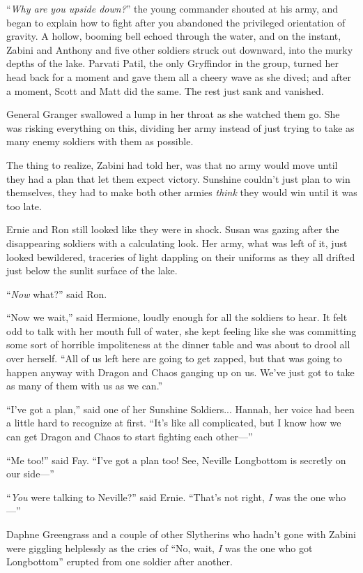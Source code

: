 “\emph{Why are you upside down?}” the young commander shouted at his army, and began to explain how to fight after you abandoned the privileged orientation of gravity.
\sbreak
A hollow, booming bell echoed through the water, and on the instant, Zabini and Anthony and five other soldiers struck out downward, into the murky depths of the lake. Parvati Patil, the only Gryffindor in the group, turned her head back for a moment and gave them all a cheery wave as she dived; and after a moment, Scott and Matt did the same. The rest just sank and vanished.

General Granger swallowed a lump in her throat as she watched them go. She was risking everything on this, dividing her army instead of just trying to take as many enemy soldiers with them as possible.

The thing to realize, Zabini had told her, was that no army would move until they had a plan that let them expect victory. Sunshine couldn’t just plan to win themselves, they had to make both other armies \emph{think} they would win until it was too late.

Ernie and Ron still looked like they were in shock. Susan was gazing after the disappearing soldiers with a calculating look. Her army, what was left of it, just looked bewildered, traceries of light dappling on their uniforms as they all drifted just below the sunlit surface of the lake.

“\emph{Now} what?” said Ron.

“Now we wait,” said Hermione, loudly enough for all the soldiers to hear. It felt odd to talk with her mouth full of water, she kept feeling like she was committing some sort of horrible impoliteness at the dinner table and was about to drool all over herself. “All of us left here are going to get zapped, but that was going to happen anyway with Dragon and Chaos ganging up on us. We’ve just got to take as many of them with us as we can.”

“I’ve got a plan,” said one of her Sunshine Soldiers... Hannah, her voice had been a little hard to recognize at first. “It’s like all complicated, but I know how we can get Dragon and Chaos to start fighting each other—”

“Me too!” said Fay. “I’ve got a plan too! See, Neville Longbottom is secretly on our side—”

“\emph{You} were talking to Neville?” said Ernie. “That’s not right, \emph{I} was the one who—”

Daphne Greengrass and a couple of other Slytherins who hadn’t gone with Zabini were giggling helplessly as the cries of “No, wait, \emph{I} was the one who got Longbottom” erupted from one soldier after another.

